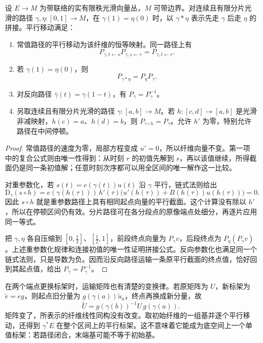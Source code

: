 \begin{proposition}\label{g1:prop:parallel-transport-laws}
	设 \(E\to M\) 为带联络的实有限秩光滑向量丛，\(M\) 可带边界。对连续且有限分片光滑的路径 \(\gamma,\eta:[0,1]\to M\)，在 \(\gamma(1)=\eta(0)\) 时，以 \(\gamma*\eta\) 表示先走 \(\gamma\) 后走 \(\eta\) 的拼接。平行移动满足：
	\begin{enumerate}
		\item 常值路径的平行移动为该纤维的恒等映射。同一路径上有
		\[
			P_{\gamma,t\leftarrow s}P_{\gamma,s\leftarrow r}=P_{\gamma,t\leftarrow r}.
		\]
		\item 若 \(\gamma(1)=\eta(0)\)，则
		\[
			P_{\gamma*\eta}=P_\eta P_\gamma.
		\]
		\item 对反向路径 \(\overline\gamma(t)=\gamma(1-t)\)，有 \(P_{\overline\gamma}=P_\gamma^{-1}\)。
		\item 另取连续且有限分片光滑的路径 \(\gamma:[a,b]\to M\)。若 \(h:[c,d]\to[a,b]\) 是光滑非减映射，\(h(c)=a\)、\(h(d)=b\)，则 \(P_{\gamma\circ h}=P_\gamma\)。允许 \(h'\) 为零，特别允许路径在中间停顿。
	\end{enumerate}
\end{proposition}
\begin{proof}
	常值路径的速度为零，局部方程变成 \(u'=0\)，所以纤维向量不变。第一项中的复合公式则由唯一性得到：从时刻 \(r\) 的初值先解到 \(s\)，再以该值继续，所得截面仍是同一条初值解；任意时刻次序都可以用全区间的唯一解作这一比较。

	对重参数化，若 \(s(t)=e(\gamma(t))u(t)\) 沿 \(\gamma\) 平行，链式法则给出
	\[
		\mathrm{D}_\tau(s\circ h)
		=e(\gamma(h(\tau)))\,h'(\tau)\bigl(u'(h(\tau))+B(h(\tau))u(h(\tau))\bigr)=0.
	\]
	因此 \(s\circ h\) 就是重参数路径上具有相同起点向量的平行截面。这个计算没有除以 \(h'\)，所以在停顿区间仍有效。分片路径可在各分段点的原像端点处细分，再逐片应用同一等式。

	把 \(\gamma,\eta\) 各自压缩到 \([0,\tfrac12]\)、\([\tfrac12,1]\)，前段终点向量为 \(P_\gamma v\)，后段终点为 \(P_\eta(P_\gamma v)\)。上述重参数化规律和连接初值的唯一性证明拼接公式。反向参数化也满足同一个链式法则，只是导数为负。因而沿反向路径运输一条原平行截面的终点值，恰好回到其起点值，给出 \(P_{\overline\gamma}=P_\gamma^{-1}\)。
\end{proof}

在两个端点更换标架时，运输矩阵也有清楚的变换律。若原矩阵为 \(U\)，新标架为 \(\widetilde e=e g\)，则起点旧分量为 \(g(\gamma(a))\widetilde u_a\)，终点再换成新分量，故
\begin{equation}\label{g1:eq:transport-frame-change}
	\widetilde U=g(\gamma(b))^{-1}U\,g(\gamma(a)).
\end{equation}
矩阵变了，所表示的纤维线性同构没有改变。取初始纤维的一组基并逐个平行移动，还得到 \(\gamma^*E\) 在整个区间上的平行标架。这不意味着它能成为底空间上一个单值标架：若路径闭合，末端基可能不等于初始基。

